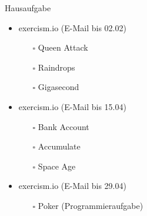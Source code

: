 \documentclass[t]{beamer}
\begin{document}
\begin{frame}[label={sec:org438b5dd}]{Hausaufgabe}
\begin{itemize}
\item exercism.io (E-Mail bis 02.02)
\begin{itemize}
\item[{$\square$}] Queen Attack
\item[{$\square$}] Raindrops
\item[{$\square$}] Gigasecond
\end{itemize}
\item exercism.io (E-Mail bis 15.04)
\begin{itemize}
\item[{$\square$}] Bank Account
\item[{$\square$}] Accumulate
\item[{$\square$}] Space Age
\end{itemize}
\item exercism.io (E-Mail bis 29.04)
\begin{itemize}
\item[{$\square$}] Poker (Programmieraufgabe)
\end{itemize}
\end{itemize}
\end{frame}
\end{document}
